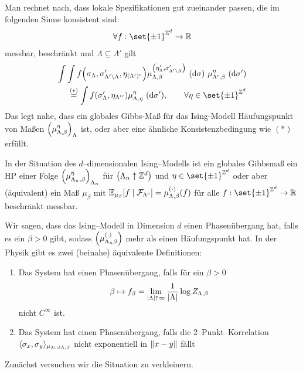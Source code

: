 	Man rechnet nach, dass lokale Spezifikationen gut zueinander passen, die im folgenden Sinne konsistent sind:
	\begin{align}
		\forall f: \set{\pm 1}^{\ZZ^d} \to \RR
	\end{align}
	messbar, beschränkt und $\Lambda \subseteq \Lambda'$ gilt
	\begin{align}
		\int \int f\enb{\sigma_{\Lambda}, \sigma'_{\Lambda' \backslash \Lambda}, \eta_{(\Lambda')^c}} \mu^{\enb{\eta'_{\Lambda}, \sigma'_{\Lambda' \backslash \Lambda}  }}_{\Lambda,\beta} \ (\diff \sigma) \ \mu^{\eta}_{\Lambda',\beta} \ (\diff \sigma') \\
		\overset{(*)}{=} \int f \enb{\sigma'_{\Lambda}, \eta_{\Lambda'^c }} \mu^{\eta}_{\Lambda, \eta} \ (\diff \sigma') , \qquad \forall \eta \in \set{\pm 1}^{\ZZ^d} 
	\end{align}
	Das legt nahe, dass ein globales Gibbs-Maß für das Ising-Modell Häufungspunkt von Maßen $\left(\mu^{\eta}_{\Lambda,\beta}\right)_{\Lambda}$ ist, oder aber eine ähnliche Konsistenzbedingung wie $(*)$ erfüllt.
	\begin{definition}
		In der Situation des $d$--dimensionalen Ising--Modells ist ein globales Gibbsmaß ein HP einer Folge $\left(\mu^{\eta}_{\Lambda_n,\beta}\right)_{\Lambda_n}$ für $\left(\Lambda_n \uparrow \mathbb{Z}^d\right)$ und $\eta \in \set{\pm 1}^{\ZZ^d}$ oder aber (äquivalent) ein Maß $\mu_{\beta}$ mit $\EW{\relax}_{\mu_{\beta}}\benb{f \;\middle\vert\; \mathcal{F}_{\Lambda^c}} = \mu_{\Lambda,\beta}^{(\cdot)} (f)$ für alle $f: \set{\pm 1}^{\ZZ^d} \to \RR $ beschränkt messbar.
	\end{definition}
	
\begin{definition}
	Wir sagen, dass das Ising--Modell in Dimension $d$ einen Phasenübergang hat, falls es ein $\beta > 0$ gibt, sodass $\left(\mu^{(\cdot)}_{\Lambda_n \beta}\right)$ mehr als einen Häufungspunkt hat. In der Physik gibt es zwei (beinahe) äquivalente Definitionen:
	\begin{enumerate}
		\item Das System hat einen Phasenübergang, falls für ein $\beta> 0$ 
		\begin{align}
			\beta \mapsto f_{\beta} = \lim\limits_{\lvert\Lambda\rvert \uparrow \infty} \frac{1}{\lvert\Lambda\rvert} \log Z_{\Lambda, \beta}
		\end{align}
		nicht $C^{\infty}$ ist.
		
		\item Das System hat einen Phasenübergang, falls die 2--Punkt--Korrelation $\langle\sigma_x,\sigma_y\rangle_{\mu_{\Lambda \cup \delta \Lambda,  \beta}}$ nicht exponentiell in $\lVert x-y\rVert$ fällt 
	\end{enumerate}
\end{definition}
	Zunächst versuchen wir die Situation zu verkleinern. 

